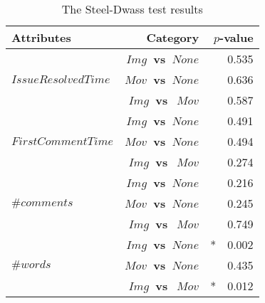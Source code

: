 \begin{table}[t]
  \begin{center}
  \caption{The Steel-Dwass test results }
  \begin{tabular}{l r|r}
    \toprule
    Attributes & Category & $p$-value\\
    \midrule
     & \bf{$Img$~vs~$None$} & 0.535 \\
     $IssueResolvedTime$ & \bf{$Mov$~vs~$None$} & 0.636\\
     & \bf{$Img$~vs~$~Mov$} & 0.587 \\
    \midrule
     & \bf{$Img$~vs~$None$} & 0.491 \\
     $FirstCommentTime$ & \bf{$Mov$~vs~$None$} & 0.494 \\
     & \bf{$Img$~vs~$~Mov$} & 0.274 \\
    \midrule
     & \bf{$Img$~vs~$None$} & 0.216 \\
     $\#comments$ & \bf{$Mov$~vs~$None$} & 0.245 \\
     & \bf{$Img$~vs~$~Mov$} & 0.749 \\
    \midrule
     & \bf{$Img$~vs~$None$} & *~~0.002 \\
     $\#words$  & \bf{$Mov$~vs~$None$} &  0.435 \\
     & \bf{$Img$~vs~$~Mov$} & *~~0.012 \\
    \bottomrule
  \end{tabular}\\
  \label{tab:Steel-Dwass-test}
  \end{center}
\end{table}